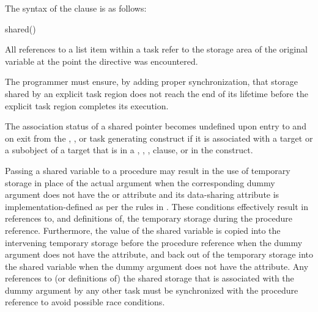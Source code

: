 \syntax
The syntax of the  clause is as follows:

\begin{ompSyntax}
shared()
\end{ompSyntax}

\descr
All references to a list item within a task refer to the storage area of the original variable
at the point the directive was encountered.

The programmer must ensure, by adding proper synchronization, that
storage shared by an explicit task region does not reach the end of its lifetime before
the explicit task region completes its execution.


\begin{fortranspecific}
The association status of a shared pointer becomes undefined upon entry to and on exit
from the , , or task generating construct if it
is associated with a target or a  subobject of a target that is in a ,
, ,  clause,  or  in the construct.


\begin{note}
Passing a shared variable to a procedure may result in the use of
temporary storage in place of the actual argument when the corresponding dummy
argument does not have the  or  attribute and its data-sharing attribute
is implementation-defined as per the rules in
.
These conditions effectively result in references to, and definitions of, the
temporary storage during the procedure reference.  Furthermore, the value of
the shared variable is copied into the intervening temporary storage before the procedure
reference when the dummy argument does not have the 
attribute, and back out of the temporary storage into the shared variable when
the dummy argument does not have the  attribute.  Any
references to (or definitions of) the shared storage that is associated with
the dummy argument by any other task must be synchronized with
the procedure reference to avoid possible race conditions.

\end{note}
\medskip
\end{fortranspecific}


